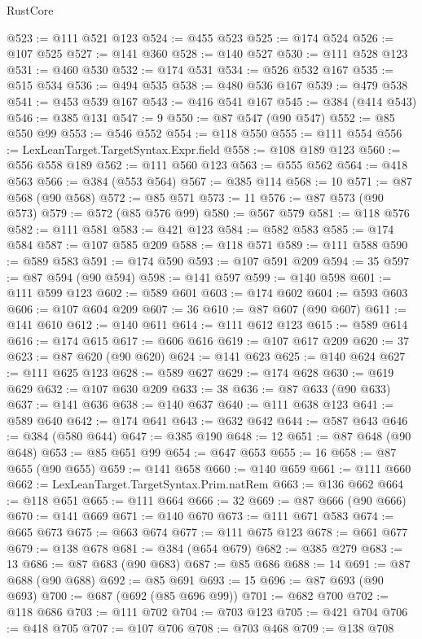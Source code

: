 \begin{lexlean}{RustCore}
\begin{coremodule}
@523 := @111 @521 @123
@524 := @455 @523
@525 := @174 @524
@526 := @107 @525
@527 := @141 @360
@528 := @140 @527
@530 := @111 @528 @123
@531 := @460 @530
@532 := @174 @531
@534 := @526 @532 @167
@535 := @515 @534
@536 := @494 @535
@538 := @480 @536 @167
@539 := @479 @538
@541 := @453 @539 @167
@543 := @416 @541 @167
@545 := @384 (@414 @543)
@546 := @385 @131
@547 := 9
@550 := @87 @547 (@90 @547)
@552 := @85 @550 @99
@553 := @546 @552
@554 := @118 @550
@555 := @111 @554
@556 := LexLeanTarget.TargetSyntax.Expr.field
@558 := @108 @189 @123
@560 := @556 @558 @189
@562 := @111 @560 @123
@563 := @555 @562
@564 := @418 @563
@566 := @384 (@553 @564)
@567 := @385 @114
@568 := 10
@571 := @87 @568 (@90 @568)
@572 := @85 @571
@573 := 11
@576 := @87 @573 (@90 @573)
@579 := @572 (@85 @576 @99)
@580 := @567 @579
@581 := @118 @576
@582 := @111 @581
@583 := @421 @123
@584 := @582 @583
@585 := @174 @584
@587 := @107 @585 @209
@588 := @118 @571
@589 := @111 @588
@590 := @589 @583
@591 := @174 @590
@593 := @107 @591 @209
@594 := 35
@597 := @87 @594 (@90 @594)
@598 := @141 @597
@599 := @140 @598
@601 := @111 @599 @123
@602 := @589 @601
@603 := @174 @602
@604 := @593 @603
@606 := @107 @604 @209
@607 := 36
@610 := @87 @607 (@90 @607)
@611 := @141 @610
@612 := @140 @611
@614 := @111 @612 @123
@615 := @589 @614
@616 := @174 @615
@617 := @606 @616
@619 := @107 @617 @209
@620 := 37
@623 := @87 @620 (@90 @620)
@624 := @141 @623
@625 := @140 @624
@627 := @111 @625 @123
@628 := @589 @627
@629 := @174 @628
@630 := @619 @629
@632 := @107 @630 @209
@633 := 38
@636 := @87 @633 (@90 @633)
@637 := @141 @636
@638 := @140 @637
@640 := @111 @638 @123
@641 := @589 @640
@642 := @174 @641
@643 := @632 @642
@644 := @587 @643
@646 := @384 (@580 @644)
@647 := @385 @190
@648 := 12
@651 := @87 @648 (@90 @648)
@653 := @85 @651 @99
@654 := @647 @653
@655 := 16
@658 := @87 @655 (@90 @655)
@659 := @141 @658
@660 := @140 @659
@661 := @111 @660
@662 := LexLeanTarget.TargetSyntax.Prim.natRem
@663 := @136 @662
@664 := @118 @651
@665 := @111 @664
@666 := 32
@669 := @87 @666 (@90 @666)
@670 := @141 @669
@671 := @140 @670
@673 := @111 @671 @583
@674 := @665 @673
@675 := @663 @674
@677 := @111 @675 @123
@678 := @661 @677
@679 := @138 @678
@681 := @384 (@654 @679)
@682 := @385 @279
@683 := 13
@686 := @87 @683 (@90 @683)
@687 := @85 @686
@688 := 14
@691 := @87 @688 (@90 @688)
@692 := @85 @691
@693 := 15
@696 := @87 @693 (@90 @693)
@700 := @687 (@692 (@85 @696 @99))
@701 := @682 @700
@702 := @118 @686
@703 := @111 @702
@704 := @703 @123
@705 := @421 @704
@706 := @418 @705
@707 := @107 @706
@708 := @703 @468
@709 := @138 @708

\end{coremodule}
\end{lexlean}
